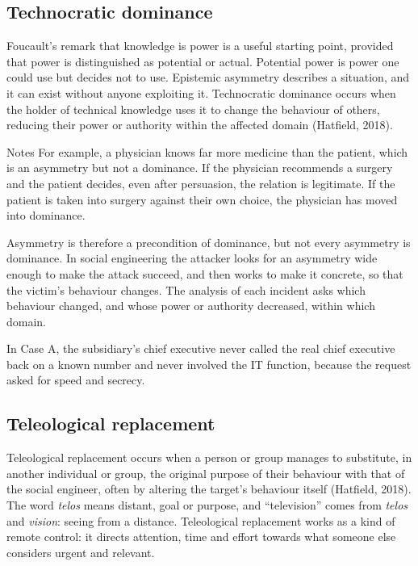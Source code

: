 \subsection{Technocratic dominance}
Foucault's remark that knowledge is power is a useful starting point, provided that power is distinguished as potential or actual. Potential power is power one could use but decides not to use. Epistemic asymmetry describes a situation, and it can exist without anyone exploiting it. Technocratic dominance occurs when the holder of technical knowledge uses it to change the behaviour of others, reducing their power or authority within the affected domain (Hatfield, 2018).

\begin{nota}{Notes}
	For example, a physician knows far more medicine than the patient, which is an asymmetry but not a dominance. If the physician recommends a surgery and the patient decides, even after persuasion, the relation is legitimate. If the patient is taken into surgery against their own choice, the physician has moved into dominance.
\end{nota}

Asymmetry is therefore a precondition of dominance, but not every asymmetry is dominance. In social engineering the attacker looks for an asymmetry wide enough to make the attack succeed, and then works to make it concrete, so that the victim's behaviour changes. The analysis of each incident asks which behaviour changed, and whose power or authority decreased, within which domain.

In Case A, the subsidiary's chief executive never called the real chief executive back on a known number and never involved the IT function, because the request asked for speed and secrecy.

\subsection{Teleological replacement}
Teleological replacement occurs when a person or group manages to substitute, in another individual or group, the original purpose of their behaviour with that of the social engineer, often by altering the target's behaviour itself (Hatfield, 2018). The word \emph{telos} means distant, goal or purpose, and ``television'' comes from \emph{telos} and \emph{vision}: seeing from a distance. Teleological replacement works as a kind of remote control: it directs attention, time and effort towards what someone else considers urgent and relevant.

